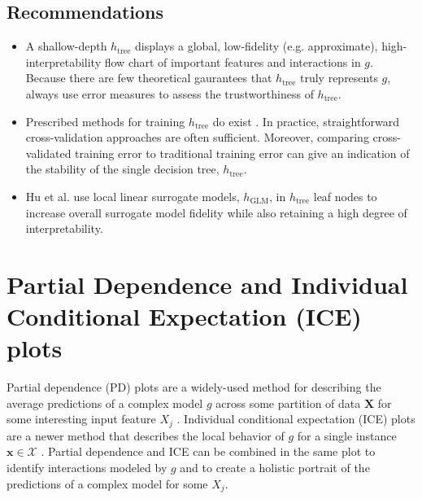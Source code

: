 \documentclass[11pt]{asaproc}
\begin{document}
\subsection{Recommendations}

\begin{itemize}
	
	\item A shallow-depth $h_{\text{tree}}$ displays a global, low-fidelity (e.g. approximate), high-interpretability flow chart of important features and interactions in $g$. Because there are few theoretical gaurantees that $h_{\text{tree}}$ truly represents $g$, always use error measures to assess the trustworthiness of $h_{\text{tree}}$.
	
	\item Prescribed methods for training $h_{\text{tree}}$ do exist \cite{dt_surrogate1} \cite{dt_surrogate2}. In practice, straightforward cross-validation approaches are often sufficient. Moreover, comparing cross-validated training error to traditional training error can give an indication of the stability of the single decision tree, $h_{\text{tree}}$.
	
	\item Hu et al. use local linear surrogate models, $h_{\text{GLM}}$, in $h_{\text{tree}}$ leaf nodes to increase overall surrogate model fidelity while also retaining a high degree of interpretability.
	
\end{itemize}

\section{Partial Dependence and Individual Conditional Expectation (ICE) plots}
\label{sec:pd_ice}

Partial dependence (PD) plots are a widely-used method for describing the average predictions of a complex model $g$ across some partition of data $\mathbf{X}$ for some interesting input feature $X_j$ \cite{esl}. Individual conditional expectation (ICE) plots are a newer method that describes the local behavior of $g$ for a single instance $\mathbf{x} \in \mathcal{X}$ \cite{ice_plots}. Partial dependence and ICE can be combined in the same plot to identify interactions modeled by $g$ and to create a holistic portrait of the predictions of a complex model for some $X_j$.
\end{document}
